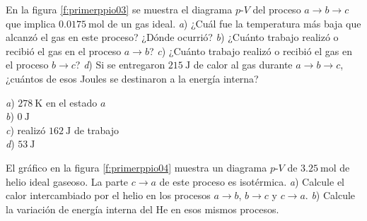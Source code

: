 %
\begin{Exercise}\label{p:primerppio03}
  En la figura \ref{f:primerppio03} se muestra el diagrama $p$-$V$ del proceso $a\rightarrow b \rightarrow c$ que implica $\SI{0.0175}{\mole}$ de un gas ideal. \textit{a}) ¿Cuál fue la temperatura más baja que alcanzó el gas en  este proceso? ¿Dónde ocurrió? \textit{b}) ¿Cuánto trabajo realizó o recibió el gas en el proceso $a \rightarrow b$? \textit{c}) ¿Cuánto trabajo realizó o recibió el gas en el proceso $b \rightarrow c$? \textit{d}) Si se entregaron $\SI{215}{\joule}$ de calor al gas durante $a\rightarrow b \rightarrow c$, ¿cuántos de esos Joules se destinaron a la energía interna?
\end{Exercise}
\begin{Answer}
	\begin{minipage}[t]{.4\textwidth}
    \textit{a}) $\SI{278}{\kelvin}$ en el estado $a$\\ \textit{b}) $\SI{0}{\joule}$\\ \textit{c}) realizó $\SI{162}{\joule}$ de trabajo\\ \textit{d}) $\SI{53}{\joule}$
  \end{minipage}
\end{Answer}
%
\begin{center}
\end{center}
%
\begin{Exercise}\label{p:primerppio04}
  El gráfico en la figura \ref{f:primerppio04} muestra un diagrama $p$-$V$ de $\SI{3.25}{\mole}$ de helio ideal gaseoso. La parte $c \rightarrow a$ de este proceso es isotérmica. \textit{a}) Calcule el calor intercambiado por el helio en los procesos $a \rightarrow b$, $b \rightarrow c$ y $c \rightarrow a$. \textit{b}) Calcule la variación de energía interna del He en esos mismos procesos.
\end{Exercise}
